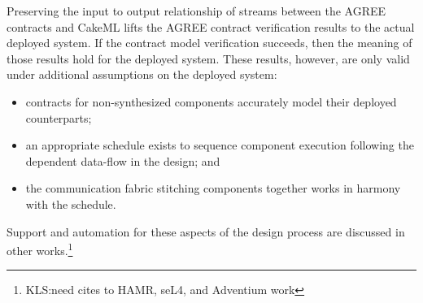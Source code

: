 Preserving the input to output relationship of streams between the
AGREE contracts and CakeML lifts the AGREE contract verification
results to the actual deployed system.  If the contract model
verification succeeds, then the meaning of those results hold for the
deployed system.  These results, however, are only valid under
additional assumptions on the deployed system:
\begin{itemize}
\item contracts for non-synthesized components accurately model their deployed
counterparts;
\item an appropriate schedule exists to sequence component
  execution following the dependent data-flow in the design; and
\item the communication fabric stitching components together works in harmony
  with the schedule.
\end{itemize}

Support and automation for these aspects of the design process are
discussed in other works.\footnote{KLS:need cites to HAMR, seL4, and Adventium work}
